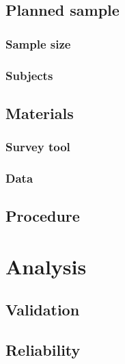 \subsection{Planned sample}
\subsubsection{Sample size}

\subsubsection{Subjects}

\subsection{Materials}
\subsubsection{Survey tool}
\subsubsection{Data}

\subsection{Procedure}

\section{Analysis}
\subsection{Validation}
\subsection{Reliability}


